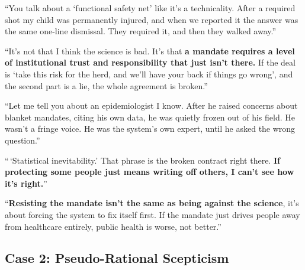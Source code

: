 \begin{casebox}

\textcolor{malRed}{``You talk about a `functional safety net' like it's a technicality. After a required shot my child was permanently injured, and when we reported it the answer was the same one-line dismissal. They required it, and then they walked away.''}

``It's not that I think the science is bad. It's that \textbf{a mandate requires a level of institutional trust and responsibility that just isn't there.} If the deal is `take this risk for the herd, and we'll have your back if things go wrong', and the second part is a lie, the whole agreement is broken.''


\textcolor{malRed}{``Let me tell you about an epidemiologist I know. After he raised concerns about blanket mandates, citing his own data, he was quietly frozen out of his field. He wasn't a fringe voice. He was the system's own expert, until he asked the wrong question.''}

``\,`Statistical inevitability.' That phrase is the broken contract right there. \textbf{If protecting some people just means writing off others, I can't see how it's right.}''

``\textbf{Resisting the mandate isn't the same as being against the science}, it's about forcing the system to fix itself first. If the mandate just drives people away from healthcare entirely, public health is worse, not better.''

\end{casebox}


\subsection{Case 2: Pseudo-Rational Scepticism}

